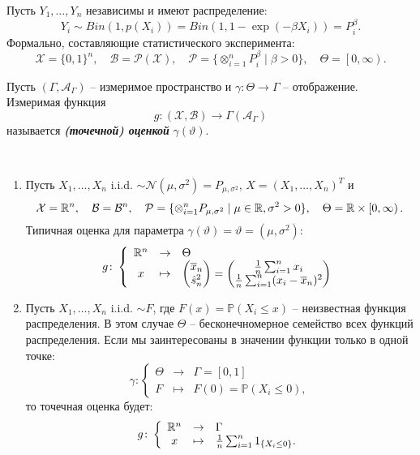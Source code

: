 \begin{exmp}
	Пусть $Y_1, \dots, Y_n$ независимы и имеют распределение:
	\[Y_i \sim Bin(1, p(X_i))=Bin(1, 1-\exp(-\beta X_i))=P_i^{\beta}.\]
	Формально, составляющие статистического эксперимента:
	\[ \mathcal{X}=\{ 0, 1 \}^n, \quad \mathcal{B}=\mathcal{P(X)}, \quad \mathcal{P}=\{\otimes_{i=1}^nP_i^{\beta} \mid \beta>0 \}, \quad \Theta=\left[0, \infty\right).  \]
\end{exmp}

\begin{defn}
	Пусть $(\Gamma, \mathcal{A}_\Gamma)$ -- измеримое пространство и $\gamma\colon \Theta \rightarrow \Gamma$ -- отображение. Измеримая функция
	\[g\colon(\mathcal{X}, \mathcal{B}) \rightarrow \Gamma(\mathcal{A}_\Gamma)  \]
	называется \textbf{\textit{(точечной) оценкой}} $\gamma(\vartheta)$.
\end{defn}

\begin{exmp} \label{exmp2.7}\
	
	\begin{enumerate}
		\item Пусть $X_1, \dots , X_n$ i.i.d. $\sim \mathcal{N}(\mu, \sigma^2)=P_{\mu, \sigma^2}$, $X=(X_1, \dots , X_n)^T$ и
		\[\mathcal{X}=\mathbb{R}^n, \quad \mathcal{B}=\mathcal{B}^n, \quad \mathcal{P}=\{\otimes_{i=1}^nP_{\mu, \sigma^2} \mid \mu \in \mathbb{R}, \sigma^2>0 \}, \quad \Theta=\mathbb{R} \times \left[0, \infty\right).\]
		Типичная оценка для параметра $\gamma(\vartheta)=\vartheta=(\mu, \sigma^2)$:
		\[ g \colon
		\left \{
		\begin{array}{ccl}
		\mathbb{R}^n & \rightarrow & \Theta \\
		x & \mapsto &\begin{pmatrix} \overline{x}_n \\ \hat{s}_n^2 \end{pmatrix} = \begin{pmatrix} \frac{1}{n} \sum_{i=1}^n x_i \\ \frac{1}{n} \sum_{i=1}^n (x_i-\overline{x}_n)^2 \end{pmatrix}
		\end{array}
		\right.
		\]
		\item Пусть $X_1, \dots , X_n$ i.i.d. $\sim F$, где $F(x)=\mathbb{P}(X_i \leq x)$ -- неизвестная функция распределения. В этом случае $\Theta$ -- бесконечномерное семейство всех функций распределения. Если мы заинтересованы в значении функции только в одной точке:
		\[ \gamma \colon
		\left \{
		\begin{array}{ccl}
		\Theta & \rightarrow & \Gamma=\left[0,1\right] \\
		F & \mapsto & F(0)=\mathbb{P}(X_i \leq 0),
		\end{array}
		\right.
		\]
		то точечная оценка будет:
		\[ g \colon
		\left \{
		\begin{array}{ccl}
		\mathbb{R}^n & \rightarrow & \Gamma \\
		x & \mapsto & \frac{1}{n} \sum_{i=1}^n 1_{\{X_i \leq 0\}}.
		\end{array}
		\right.
		\]
	\end{enumerate}
\end{exmp}

